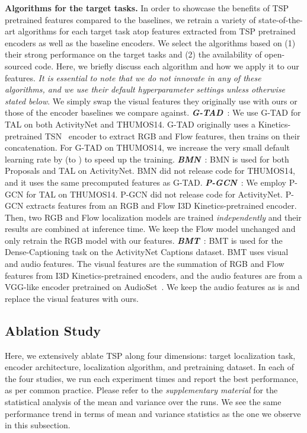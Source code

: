 \documentclass[10pt,twocolumn,letterpaper]{article}
\begin{document}
\vspace{3pt}\noindent\textbf{Algorithms for the target tasks.}
In order to showcase the benefits of TSP pretrained features compared to the baselines, we retrain a variety of state-of-the-art algorithms for each target task atop features extracted from TSP pretrained encoders as well as the baseline encoders. We select the algorithms based on (1) their strong performance on the target tasks and (2) the availability of open-sourced code. Here, we briefly discuss each algorithm and how we apply it to our features. \emph{It is essential to note that we do not innovate in any of these algorithms, and we use their default hyperparameter settings unless otherwise stated below}. We simply swap the visual features they originally use with ours or those of the encoder baselines we compare against. 
\textbf{\textit{G-TAD}}~\cite{xu2020gtad}: 
We use G-TAD for TAL on both ActivityNet and THUMOS14. G-TAD originally uses a Kinetics-pretrained TSN~\cite{tsn} encoder to extract RGB and Flow features, then trains on their concatenation. For G-TAD on THUMOS14, we increase the very small default learning rate by  (\ie to ) to speed up the training.
\textbf{\textit{BMN}}~\cite{Lin_2019_ICCV}:
BMN is used for both Proposals and TAL on ActivityNet. BMN did not release code for THUMOS14, and it uses the same precomputed features as G-TAD.
\textbf{\textit{P-GCN}}~\cite{Zeng_2019_ICCV}:
We employ P-GCN for TAL on THUMOS14. P-GCN did not release code for ActivityNet. P-GCN extracts features from an RGB and Flow I3D Kinetics-pretrained encoder. Then, two RGB and Flow localization models are trained \textit{independently} and their results are combined at inference time. We keep the Flow model unchanged and only retrain the RGB model with our features.
\textbf{\textit{BMT}}~\cite{bmt}:
BMT is used for the Dense-Captioning task on the ActivityNet Captions dataset. BMT uses visual and audio features. The visual features are the summation of RGB and Flow features from I3D Kinetics-pretrained encoders, and the audio features are from a VGG-like encoder pretrained on AudioSet~\cite{dataset_audioset}. We keep the audio features as is and replace the visual features with ours.


\subsection{Ablation Study}
Here, we extensively ablate TSP along four dimensions: target localization task, encoder architecture, localization algorithm, and pretraining dataset. In each of the four studies, we run each experiment  times and report the best performance, as per common practice. Please refer to the \emph{supplementary material} for the statistical analysis of the mean and variance over the  runs. We see the same performance trend in terms of mean and variance statistics as the one we observe in this subsection.
\end{document}
